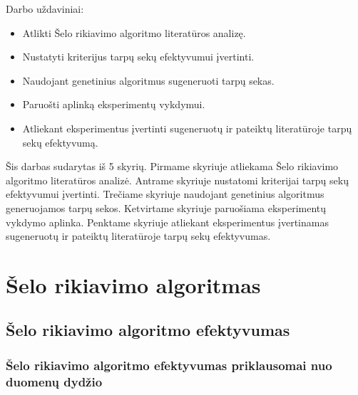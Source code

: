 \documentclass{VUMIFInfKursinis}
\begin{document}
Darbo uždaviniai:
\begin{itemize}
  \item Atlikti Šelo rikiavimo algoritmo literatūros analizę.
  \item Nustatyti kriterijus tarpų sekų efektyvumui įvertinti.
  \item Naudojant genetinius algoritmus sugeneruoti tarpų sekas.
  \item Paruošti aplinką eksperimentų vykdymui.
  \item Atliekant eksperimentus įvertinti sugeneruotų ir pateiktų literatūroje tarpų sekų efektyvumą.
\end{itemize}

Šis darbas sudarytas iš 5 skyrių.
Pirmame skyriuje atliekama Šelo rikiavimo algoritmo literatūros analizė.
Antrame skyriuje nustatomi kriterijai tarpų sekų efektyvumui įvertinti.
Trečiame skyriuje naudojant genetinius algoritmus generuojamos tarpų sekos.
Ketvirtame skyriuje paruošiama eksperimentų vykdymo aplinka.
Penktame skyriuje atliekant eksperimentus įvertinamas sugeneruotų ir pateiktų literatūroje tarpų sekų efektyvumas.

\section{Šelo rikiavimo algoritmas}

\subsection{Šelo rikiavimo algoritmo efektyvumas}



\subsubsection{Šelo rikiavimo algoritmo efektyvumas priklausomai nuo duomenų dydžio}
\end{document}
